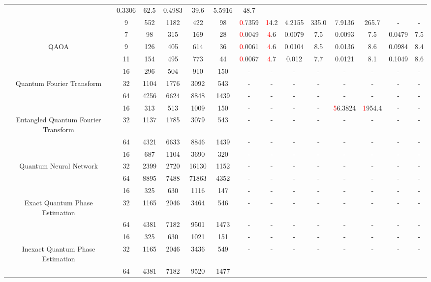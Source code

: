 \begin{table}[htb]
{\begin{tabular}{|c|c|c|c|c|c|c|c|c|c|c|c|c|c|}
 & 0.3306 & 62.5
 & 0.4983 & 39.6
 & 5.5916 & 48.7
 \\
 & 
9 & 552 & 1182 & 422 & 98
 & \textcolor{red}0.7359 & \textcolor{red}14.2
 & 4.2155 & 335.0
 & 7.9136 & 265.7
 & - & -
 \\
\hline
 & 
7 & 98 & 315 & 169 & 28
 & \textcolor{red}0.0049 & \textcolor{red}4.6
 & 0.0079 & 7.5
 & 0.0093 & 7.5
 & 0.0479 & 7.5
 \\
QAOA & 
9 & 126 & 405 & 614 & 36
 & \textcolor{red}0.0061 & \textcolor{red}4.6
 & 0.0104 & 8.5
 & 0.0136 & 8.6
 & 0.0984 & 8.4
 \\
 & 
11 & 154 & 495 & 773 & 44
 & \textcolor{red}0.0067 & \textcolor{red}4.7
 & 0.012 & 7.7
 & 0.0121 & 8.1
 & 0.1049 & 8.6
 \\
\hline
 & 
16 & 296 & 504 & 910 & 150
 & - & -
 & - & -
 & - & -
 & - & -
 \\
Quantum Fourier Transform & 
32 & 1104 & 1776 & 3092 & 543
 & - & -
 & - & -
 & - & -
 & - & -
 \\
 & 
64 & 4256 & 6624 & 8848 & 1439
 & - & -
 & - & -
 & - & -
 & - & -
 \\
\hline
 & 
16 & 313 & 513 & 1009 & 150
 & - & -
 & - & -
 & \textcolor{red}56.3824 & \textcolor{red}1954.4
 & - & -
 \\
Entangled Quantum Fourier Transform & 
32 & 1137 & 1785 & 3079 & 543
 & - & -
 & - & -
 & - & -
 & - & -
 \\
 & 
64 & 4321 & 6633 & 8846 & 1439
 & - & -
 & - & -
 & - & -
 & - & -
 \\
\hline
 & 
16 & 687 & 1104 & 3690 & 320
 & - & -
 & - & -
 & - & -
 & - & -
 \\
Quantum Neural Network & 
32 & 2399 & 2720 & 16130 & 1152
 & - & -
 & - & -
 & - & -
 & - & -
 \\
 & 
64 & 8895 & 7488 & 71863 & 4352
 & - & -
 & - & -
 & - & -
 & - & -
 \\
\hline
 & 
16 & 325 & 630 & 1116 & 147
 & - & -
 & - & -
 & - & -
 & - & -
 \\
Exact Quantum Phase Estimation & 
32 & 1165 & 2046 & 3464 & 546
 & - & -
 & - & -
 & - & -
 & - & -
 \\
 & 
64 & 4381 & 7182 & 9501 & 1473
 & - & -
 & - & -
 & - & -
 & - & -
 \\
\hline
 & 
16 & 325 & 630 & 1021 & 151
 & - & -
 & - & -
 & - & -
 & - & -
 \\
Inexact Quantum Phase Estimation & 
32 & 1165 & 2046 & 3436 & 549
 & - & -
 & - & -
 & - & -
 & - & -
 \\
 & 
64 & 4381 & 7182 & 9520 & 1477

\end{tabular}}
\end{table}

